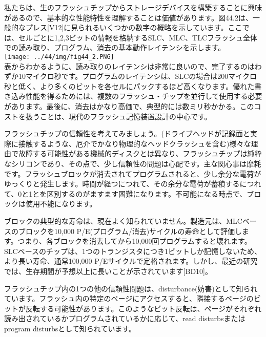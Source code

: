 私たちは、生のフラッシュチップからストレージデバイスを構築することに興味があるので、基本的な性能特性を理解することは価値があります。図44.2は、一般的なプレス{[}V12{]}に見られるいくつかの数字の概略を示しています。ここでは、セルごとに1,2,3ビットの情報を格納するSLC、MLC、TLCフラッシュ全体での読み取り、プログラム、消去の基本動作レイテンシを示します。\\
\texttt{[image: ../44/img/fig44\_2.PNG]}\\
表からわかるように、読み取りのレイテンシは非常に良いので、完了するのはわずか10マイクロ秒です。プログラムのレイテンシは、SLCの場合は200マイクロ秒と低く、より多くのビットを各セルにパックするほど高くなります。優れた書き込み性能を得るためには、複数のフラッシュ・チップを並行して使用する必要があります。最後に、消去はかなり高価で、典型的には数ミリ秒かかる。このコストを扱うことは、現代のフラッシュ記憶装置設計の中心です。

フラッシュチップの信頼性を考えてみましょう。(ドライブヘッドが記録面と実際に接触するような、厄介でかなり物理的なヘッドクラッシュを含む)様々な理由で故障する可能性がある機械的ディスクとは異なり、フラッシュチップは純粋なシリコンであり、その点で、少し信頼性の問題は心配です。主な関心事は摩耗です。フラッシュブロックが消去されてプログラムされると、少し余分な電荷がゆっくりと発生します。時間が経つにつれて、その余分な電荷が蓄積するにつれて、0と1とを区別するのがますます困難になります。不可能になる時点で、ブロックは使用不能になります。

ブロックの典型的な寿命は、現在よく知られていません。製造元は、MLCベースのブロックを10,000
P/E(プログラム/消去)サイクルの寿命として評価します。つまり、各ブロックを消去してから10,000回プログラムすると壊れます。SLCベースのチップは、1つのトランジスタにつき1ビットしか記憶しないため、より長い寿命、通常100,000
P/Eサイクルで定格されます。しかし、最近の研究では、生存期間が予想以上に長いことが示されています{[}BD10{]}。

フラッシュチップ内の1つの他の信頼性問題は、disturbance(妨害)として知られています。フラッシュ内の特定のページにアクセスすると、隣接するページのビットが反転する可能性があります。このようなビット反転は、ページがそれぞれ読み出されているかプログラムされているかに応じて、read
disturbsまたはprogram disturbsとして知られています。


